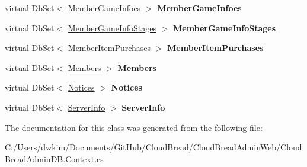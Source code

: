 \begin{DoxyCompactItemize}
\item 
virtual Db\+Set$<$ \hyperlink{class_cloud_bread_admin_web_1_1_member_game_infoes}{Member\+Game\+Infoes} $>$ {\bfseries Member\+Game\+Infoes}\hypertarget{class_cloud_bread_admin_web_1_1_cloud_bread_d_b_admin_entities_a9d100a658fca7ffe660f1d8cc2f9b1fe}{}\label{class_cloud_bread_admin_web_1_1_cloud_bread_d_b_admin_entities_a9d100a658fca7ffe660f1d8cc2f9b1fe}

\item 
virtual Db\+Set$<$ \hyperlink{class_cloud_bread_admin_web_1_1_member_game_info_stages}{Member\+Game\+Info\+Stages} $>$ {\bfseries Member\+Game\+Info\+Stages}\hypertarget{class_cloud_bread_admin_web_1_1_cloud_bread_d_b_admin_entities_a068e8c53f6de34b24adbe7b5fc7b8ee9}{}\label{class_cloud_bread_admin_web_1_1_cloud_bread_d_b_admin_entities_a068e8c53f6de34b24adbe7b5fc7b8ee9}

\item 
virtual Db\+Set$<$ \hyperlink{class_cloud_bread_admin_web_1_1_member_item_purchases}{Member\+Item\+Purchases} $>$ {\bfseries Member\+Item\+Purchases}\hypertarget{class_cloud_bread_admin_web_1_1_cloud_bread_d_b_admin_entities_aa7ca3897a4f4a4a687e0dc60ebfe2476}{}\label{class_cloud_bread_admin_web_1_1_cloud_bread_d_b_admin_entities_aa7ca3897a4f4a4a687e0dc60ebfe2476}

\item 
virtual Db\+Set$<$ \hyperlink{class_cloud_bread_admin_web_1_1_members}{Members} $>$ {\bfseries Members}\hypertarget{class_cloud_bread_admin_web_1_1_cloud_bread_d_b_admin_entities_a38c8f483ece9bae4844f446d481e8766}{}\label{class_cloud_bread_admin_web_1_1_cloud_bread_d_b_admin_entities_a38c8f483ece9bae4844f446d481e8766}

\item 
virtual Db\+Set$<$ \hyperlink{class_cloud_bread_admin_web_1_1_notices}{Notices} $>$ {\bfseries Notices}\hypertarget{class_cloud_bread_admin_web_1_1_cloud_bread_d_b_admin_entities_acba614f544c7cac3062e5cf23e3f7ba1}{}\label{class_cloud_bread_admin_web_1_1_cloud_bread_d_b_admin_entities_acba614f544c7cac3062e5cf23e3f7ba1}

\item 
virtual Db\+Set$<$ \hyperlink{class_cloud_bread_admin_web_1_1_server_info}{Server\+Info} $>$ {\bfseries Server\+Info}\hypertarget{class_cloud_bread_admin_web_1_1_cloud_bread_d_b_admin_entities_a94422dffbcb562c866a3976651658e5f}{}\label{class_cloud_bread_admin_web_1_1_cloud_bread_d_b_admin_entities_a94422dffbcb562c866a3976651658e5f}

\end{DoxyCompactItemize}


The documentation for this class was generated from the following file\+:\begin{DoxyCompactItemize}
\item 
C\+:/\+Users/dwkim/\+Documents/\+Git\+Hub/\+Cloud\+Bread/\+Cloud\+Bread\+Admin\+Web/Cloud\+Bread\+Admin\+D\+B.\+Context.\+cs\end{DoxyCompactItemize}
